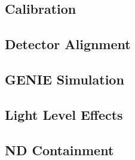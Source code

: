\subsection{Calibration}

\subsection{Detector Alignment}

\subsection{GENIE Simulation}

\subsection{Light Level Effects}

\subsection{ND Containment}

